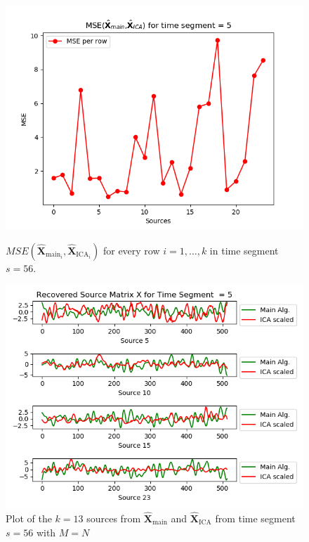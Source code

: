 \begin{figure}[H]
\begin{widepage}
    \begin{minipage}[t]{.45\textwidth}
\centering
\includegraphics[width=1\linewidth]{figures/ch_7/resultat/mse_none_removed_ica_timeseg5.png}
\caption{$MSE\left(\hat{\mathbf{X}}_{\text{main}_{i}},\hat{\mathbf{X}}_{\text{ICA}_{i}}\right)$ for every row $i = 1, \hdots, k$ in time segment $s=56$.}
\label{fig:M=N_2}
\end{minipage} 
\hspace{0.5cm}
\begin{minipage}[t]{.45\textwidth}
\centering
\includegraphics[width=1\linewidth]{figures/ch_7/resultat/EEG_none_removed_scaled_timeseg5S1_CClean.png}
\caption{Plot of the $k = 13$ sources from $\hat{\mathbf{X}}_{\text{main}}$ and $\hat{\mathbf{X}}_{\text{ICA}}$ from time segment $s = 56$ with $M=N$}
	\label{fig:M=N_3}
    \end{minipage}
\end{widepage}
\end{figure}
